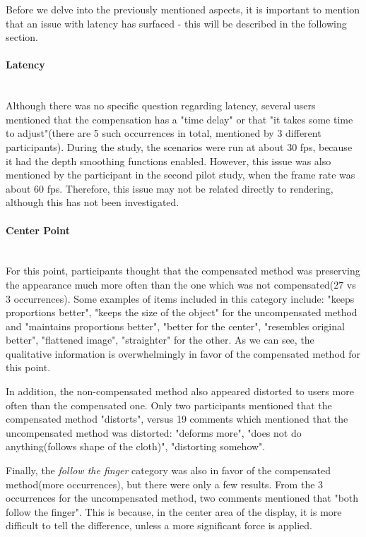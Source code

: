 \documentclass[]{article}
\begin{document}
Before we delve into the previously mentioned aspects, it is important to mention that an issue with latency has surfaced - this will be described in the following section. 

\paragraph{Latency}\mbox{}\\

Although there was no specific question regarding latency, several users mentioned that the compensation has a "time delay" or that "it takes some time to adjust"(there are 5 such occurrences in total, mentioned by 3 different participants). During the study, the scenarios were run at about 30 fps, because it had the depth smoothing functions enabled. However, this issue was also mentioned by the participant in the second pilot study, when the frame rate was about 60 fps. Therefore, this issue may not be related directly to rendering, although this has not been investigated.
 

\paragraph{Center Point}\mbox{}\\


For this point, participants thought that the compensated method was preserving the appearance much  more often than the one which was not compensated(27 vs 3 occurrences). Some examples of items included in this category include: "keeps proportions better", "keeps the size of the object" for the uncompensated method and
"maintains proportions better", "better for the center", "resembles original better", "flattened image", "straighter" for the other. As we can see, the qualitative information is overwhelmingly in favor of the compensated method for this point. 

In addition, the non-compensated method also appeared distorted to users more often than the compensated one. Only two participants mentioned that the compensated method "distorts", versus 19 comments which mentioned that the uncompensated method was distorted: "deforms more", "does not do anything(follows shape of the cloth)", "distorting somehow".

Finally, the \textit{follow the finger} category was also in favor of the compensated method(more occurrences), but there were only a few results. From the 3 occurrences for the uncompensated method, two comments mentioned that "both follow the finger". This is because, in the center area of the display, it is more difficult to tell the difference, unless a more significant force is applied.
\end{document}
